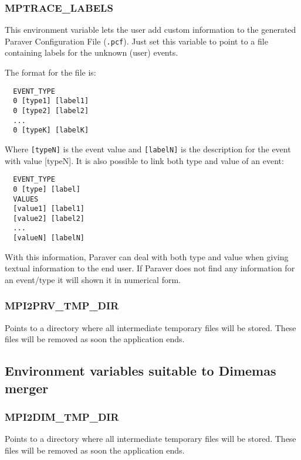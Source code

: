 \subsubsection{MPTRACE\_LABELS}

This environment variable lets the user add custom information to the generated Paraver Configuration File ({\tt .pcf}). Just set this variable to point to a file containing labels for the unknown (user) events.

The format for the file is:

\begin{verbatim}
  EVENT_TYPE
  0 [type1] [label1]
  0 [type2] [label2]
  ...
  0 [typeK] [labelK]
\end{verbatim}

Where {\tt [typeN]} is the event value and {\tt [labelN]} is the description for the event with value [typeN].
It is also possible to link both type and value of an event:

\begin{verbatim}
  EVENT_TYPE
  0 [type] [label]
  VALUES
  [value1] [label1]
  [value2] [label2]
  ...
  [valueN] [labelN]
\end{verbatim}

With this information, Paraver can deal with both type and  value when giving textual information to the end user. If Paraver does not find any information for an event/type it will shown it in numerical form.

\subsubsection{MPI2PRV\_TMP\_DIR}

Points to a directory where all intermediate temporary files will be stored. These files will be removed as soon the application ends.

\subsection{Environment variables suitable to Dimemas merger}

\subsubsection{MPI2DIM\_TMP\_DIR}

Points to a directory where all intermediate temporary files will be stored. These files will be removed as soon the application ends.

